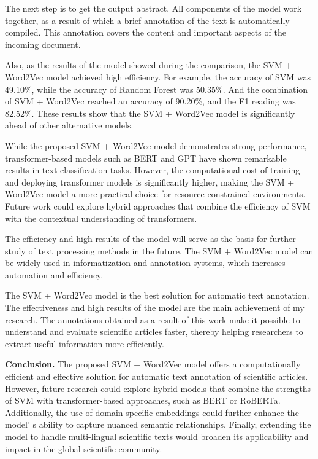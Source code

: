 The next step is to get the output abstract. All components of the model
work together, as a result of which a brief annotation of the text is
automatically compiled. This annotation covers the content and important
aspects of the incoming document.

Also, as the results of the model showed during the comparison, the SVM
+ Word2Vec model achieved high efficiency. For example, the accuracy of
SVM was 49.10\%, while the accuracy of Random Forest was 50.35\%. And
the combination of SVM + Word2Vec reached an accuracy of 90.20\%, and
the F1 reading was 82.52\%. These results show that the SVM + Word2Vec
model is significantly ahead of other alternative models.

While the proposed SVM + Word2Vec model demonstrates strong performance,
transformer-based models such as BERT and GPT have shown remarkable
results in text classification tasks. However, the computational cost of
training and deploying transformer models is significantly higher,
making the SVM + Word2Vec model a more practical choice for
resource-constrained environments. Future work could explore hybrid
approaches that combine the efficiency of SVM with the contextual
understanding of transformers.

The efficiency and high results of the model will serve as the basis for
further study of text processing methods in the future. The SVM +
Word2Vec model can be widely used in informatization and annotation
systems, which increases automation and efficiency.

The SVM + Word2Vec model is the best solution for automatic text
annotation. The effectiveness and high results of the model are the main
achievement of my research. The annotations obtained as a result of this
work make it possible to understand and evaluate scientific articles
faster, thereby helping researchers to extract useful information more
efficiently.

{\bfseries Conclusion.} The proposed SVM + Word2Vec model offers a
computationally efficient and effective solution for automatic text
annotation of scientific articles. However, future research could
explore hybrid models that combine the strengths of SVM with
transformer-based approaches, such as BERT or RoBERTa. Additionally, the
use of domain-specific embeddings could further enhance the
model' s ability to capture nuanced semantic
relationships. Finally, extending the model to handle multi-lingual
scientific texts would broaden its applicability and impact in the
global scientific community.

